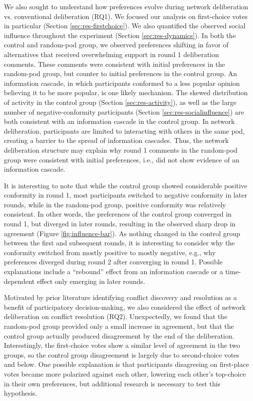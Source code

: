 {We also sought to understand how preferences evolve during network deliberation vs. conventional deliberation (RQ1).
We focused our analysis on first-choice votes in particular (Section \ref{sec:res-firstchoice}).
We also quantified the observed social influence throughout the experiment (Section \ref{sec:res-dynamics}).
In both the control and random-pod group, we observed preferences shifting in favor of alternatives that received overwhelming support in round 1 deliberation comments.
These comments were consistent with initial preferences in the random-pod group, but counter to initial preferences in the control group.
An information cascade, in which participants conformed to a less popular opinion believing it to be more popular, is one likely mechanism.
The skewed distribution of activity in the control group (Section \ref{sec:res-activity}), as well as the large number of negative-conformity participants (Section \ref{sec:res-socialinfluence}) are both consistent with an information cascade in the control group.
In network deliberation, participants are limited to interacting with others in the same pod, creating a barrier to the spread of information cascades.
Thus, the network deliberation structure may explain why round 1 comments in the random-pod group were consistent with initial preferences, i.e., did not show evidence of an information cascade.

It is interesting to note that while the control group showed considerable positive conformity in round 1, most participants switched to negative conformity in later rounds, while in the random-pod group, positive conformity was relatively consistent.
In other words, the preferences of the control group converged in round 1, but diverged in later rounds, resulting in the observed sharp drop in agreement (Figure \ref{fig:influence-bar}).
As nothing changed in the control group between the first and subsequent rounds, it is interesting to consider why the conformity switched from mostly positive to mostly negative, e.g., why preferences diverged during round 2 after converging in round 1.
Possible explanations include a ``rebound'' effect from an information cascade or a time-dependent effect only emerging in later rounds.

Motivated by prior literature identifying conflict discovery and resolution as a benefit of participatory decision-making, we also considered the effect of network deliberation on conflict resolution (RQ2).
Unexpectedly, we found that the random-pod group provided only a small increase in agreement, but that the control group actually produced disagreement by the end of the deliberation.
Interestingly, the first-choice votes show a similar level of agreement in the two groups, so the control group disagreement is largely due to second-choice votes and below.
One possible explanation is that participants disagreeing on first-place votes became more polarized against each other, lowering each other's top-choice in their own preferences, but additional research is necessary to test this hypothesis.

}
